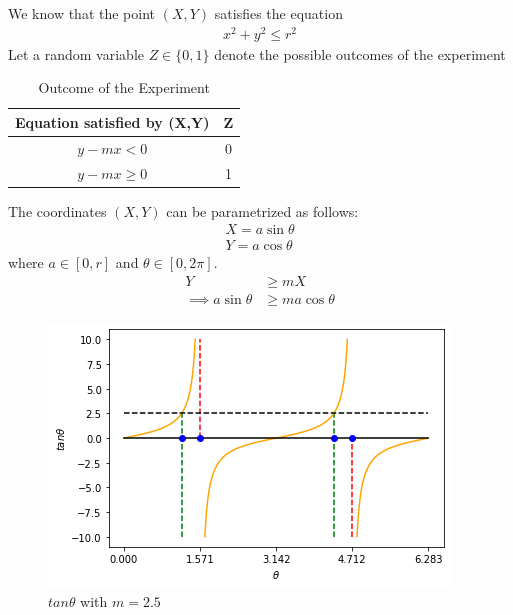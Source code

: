 
We know that the point $(X,Y)$ satisfies the equation 
\begin{align}
x^2 + y^2 \leq r^2 
\end{align}
Let a random variable $Z\in \{0,1\}$ denote the possible outcomes of the experiment
\begin{table}[h]
\centering
    \begin{tabular}{|c|c|}
        \hline
        Equation satisfied by (X,Y)& Z    \\\hline
        $y-mx<0$ & 0    \\\hline
        $y-mx\geq0$ & 1 \\\hline
    \end{tabular}
\caption{Outcome of the Experiment}
\label{ma2001-2.23:table=1}
\end{table}

The coordinates $(X,Y)$ can be parametrized as follows:
\begin{align}
    X = a\sin\theta\\
    Y = a\cos\theta
\end{align} 
where $a \in [0,r]$ and $\theta \in [0, 2\pi]$. 
\begin{align}
    Y &\geq mX\\
    \implies a\sin\theta &\geq ma\cos\theta
\end{align}

\begin{figure}[h]
    \centering
    \includegraphics[width=\columnwidth]{solutions/ma/2001/2.23/figures/tanx.png}
    \caption{$tan\theta$ with $m=2.5$}
    \label{ma2001-2.23:tanx}
\end{figure}

